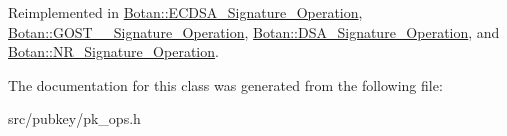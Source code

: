 Reimplemented in \hyperlink{classBotan_1_1ECDSA__Signature__Operation_a1a43fa9351b6050bd536514544f87399}{Botan\-::\-E\-C\-D\-S\-A\-\_\-\-Signature\-\_\-\-Operation}, \hyperlink{classBotan_1_1GOST__3410__Signature__Operation_a2767f276ebdadaf6111d74c4f68716af}{Botan\-::\-G\-O\-S\-T\-\_\-\_\-\-Signature\-\_\-\-Operation}, \hyperlink{classBotan_1_1DSA__Signature__Operation_a12213da35063b1a68a13c19ec15f24cb}{Botan\-::\-D\-S\-A\-\_\-\-Signature\-\_\-\-Operation}, and \hyperlink{classBotan_1_1NR__Signature__Operation_a0915f24c8cf69f453a71326dddd5b1b9}{Botan\-::\-N\-R\-\_\-\-Signature\-\_\-\-Operation}.



The documentation for this class was generated from the following file\-:\begin{DoxyCompactItemize}
\item 
src/pubkey/pk\-\_\-ops.\-h\end{DoxyCompactItemize}
